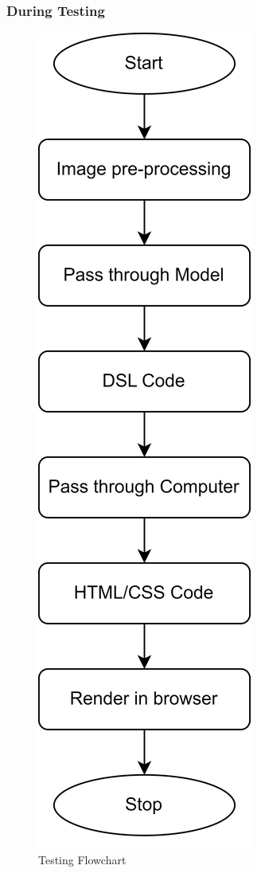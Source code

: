 \subsubsection{During Testing}
 \begin{figure}[H]
 \centering
        \includegraphics[scale=1.5]{images/testing flowchart.png}
        \caption{Testing Flowchart}
        \label{fig:flowtr}
    \end{figure}




    \pagebreak